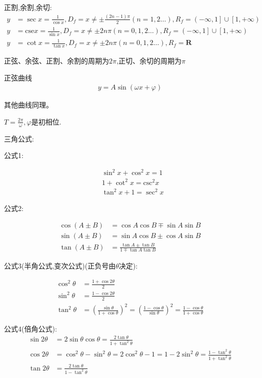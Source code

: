 \documentclass[utf8]{ctexart}
\begin{document}
正割,余割,余切:
\begin{align}
    y&=\sec x=\frac{1}{\cos x},D_f=x\neq \pm \frac{(2n-1)\pi}{2}(n=1,2\ldots ),R_f= \left(-\infty ,1 \right]\cup\left[1,+\infty \right)\\
    y&=\text{cse} x =\frac{1}{\sin x},D_f=x\neq \pm 2n\pi(n=0,1,2\ldots),R_f= \left(-\infty ,1 \right]\cup\left[1,+\infty \right)\\
    y&=\cot x=\frac{1}{\tan x},D_f=x\neq \pm 2n\pi(n=0,1,2\ldots),R_f= \mathbf{R}   
\end{align}

正弦、余弦、正割、余割的周期为$2\pi$,正切、余切的周期为$\pi$

正弦曲线
\begin{align}
    y=A\sin (\omega x+\varphi )
\end{align}

其他曲线同理。

$T=\frac{2\pi}{\omega },\varphi $是初相位.

三角公式:

公式1:

\begin{align}
    &\sin^2 x+\cos^2 x=1\\
    &1+\cot^2 x=\text{csc}^2 x\\
    &\tan^2 x +1=\sec^2 x
\end{align}

公式2:

\begin{align}
    \cos (A\pm B)&=\cos A \cos B \mp \sin A \sin B\\
    \sin (A\pm B)&=\sin A \cos B \pm\cos A \sin B\\
    \tan (A\pm B)&=\frac{\tan A \pm \tan B}{1\mp \tan A\tan B}
\end{align}

公式3(半角公式,变次公式)(正负号由$\theta $决定):

\begin{align}
    \cos ^{2}\theta &=\frac{1+\cos 2\theta }{2}\\
    \sin ^{2}\theta &=\frac{1-\cos 2\theta }{2}\\
    \tan ^{2}\theta &=(\frac{\sin \theta}{1+\cos \theta})^{2}=(\frac{1-\cos \theta}{\sin \theta})^{2}=\frac{1-\cos \theta}{1+\cos \theta}
\end{align}

公式4(倍角公式):
\begin{align}
    \sin 2\theta &=2\sin\theta \cos \theta =\frac{2\tan \theta}{1+\tan^{2}\theta}\\
    \cos 2\theta &=\cos ^{2}\theta -\sin ^{2}\theta =2\cos ^{2}\theta -1=1-2\sin^{2}\theta=\frac{1-\tan^{2}\theta}{1+\tan^{2}\theta}\\
    \tan 2\theta&=\frac{2\tan \theta}{1-\tan^{2}\theta}
\end{align}
\end{document}

